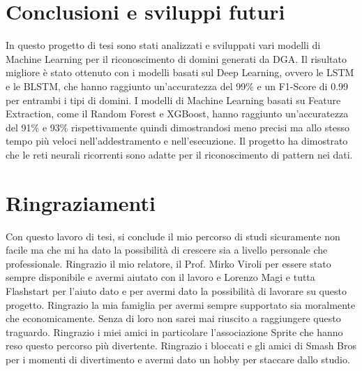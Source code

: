 \documentclass[12pt,a4paper,openright,twoside]{book}
\begin{document}
\chapter{Conclusioni e sviluppi futuri}
In questo progetto di tesi sono stati analizzati e sviluppati
vari modelli di Machine Learning per il riconoscimento
di domini generati da DGA.
Il risultato migliore è stato ottenuto con i modelli basati sul 
Deep Learning, ovvero le LSTM e le BLSTM,
che hanno raggiunto un'accuratezza del 99\% e un F1-Score
di 0.99 per entrambi i tipi di domini.
I modelli di Machine Learning basati su Feature Extraction, come il Random Forest e XGBoost,
hanno raggiunto un'accuratezza del 91\% e 93\% rispettivamente
quindi dimostrandosi meno precisi ma allo stesso tempo
più veloci nell'addestramento e nell'esecuzione.
Il progetto ha dimostrato che le reti neurali ricorrenti
sono adatte per il riconoscimento di pattern nei dati.



% 




\backmatter
\cleardoublepage
{}



\chapter*{Ringraziamenti}
Con questo lavoro di tesi, si conclude il mio percorso di studi
sicuramente non facile ma che mi ha dato la possibilità di crescere sia
a livello personale che professionale.  \hfill \break
Ringrazio il mio relatore, il Prof. Mirko Viroli per essere stato sempre disponibile e avermi aiutato con il lavoro
e Lorenzo Magi e tutta Flashstart per l'aiuto dato e per avermi dato la possibilità di lavorare su questo progetto.  \hfill \break
Ringrazio la mia famiglia per avermi sempre supportato sia moralmente che economicamente. Senza
di loro non sarei mai riuscito a raggiungere questo traguardo.  \hfill \break
Ringrazio i miei amici in particolare l'associazione Sprite che hanno
reso questo percorso più divertente.
Ringrazio i bloccati e gli amici di Smash Bros per i momenti di divertimento e avermi dato un hobby per
staccare dallo studio.
\end{document}
